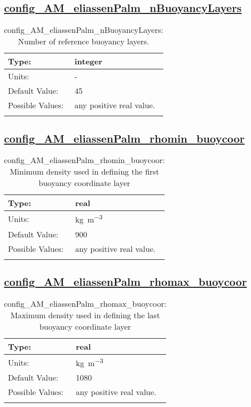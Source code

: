\subsection[config\_AM\_eliassenPalm\_nBuoyancyLayers]{\hyperref[sec:nm_tab_AM_eliassenPalm]{config\_AM\_eliassenPalm\_nBuoyancyLayers}}
\label{subsec:nm_sec_config_AM_eliassenPalm_nBuoyancyLayers}
\begin{center}
\begin{longtable}{| p{2.0in} || p{4.0in} |}
    \hline
    Type: & integer \\
    \hline
    Units: & \si{-} \\
    \hline
    Default Value: & 45 \\
    \hline
    Possible Values: & any positive real value. \\
    \hline
    \caption{config\_AM\_eliassenPalm\_nBuoyancyLayers: Number of reference buoyancy layers.}
\end{longtable}
\end{center}
\subsection[config\_AM\_eliassenPalm\_rhomin\_buoycoor]{\hyperref[sec:nm_tab_AM_eliassenPalm]{config\_AM\_eliassenPalm\_rhomin\_buoycoor}}
\label{subsec:nm_sec_config_AM_eliassenPalm_rhomin_buoycoor}
\begin{center}
\begin{longtable}{| p{2.0in} || p{4.0in} |}
    \hline
    Type: & real \\
    \hline
    Units: & \si{kg.m^{-3}} \\
    \hline
    Default Value: & 900 \\
    \hline
    Possible Values: & any positive real value. \\
    \hline
    \caption{config\_AM\_eliassenPalm\_rhomin\_buoycoor: Minimum density used in defining the first buoyancy coordinate layer}
\end{longtable}
\end{center}
\subsection[config\_AM\_eliassenPalm\_rhomax\_buoycoor]{\hyperref[sec:nm_tab_AM_eliassenPalm]{config\_AM\_eliassenPalm\_rhomax\_buoycoor}}
\label{subsec:nm_sec_config_AM_eliassenPalm_rhomax_buoycoor}
\begin{center}
\begin{longtable}{| p{2.0in} || p{4.0in} |}
    \hline
    Type: & real \\
    \hline
    Units: & \si{kg.m^{-3}} \\
    \hline
    Default Value: & 1080 \\
    \hline
    Possible Values: & any positive real value. \\
    \hline
    \caption{config\_AM\_eliassenPalm\_rhomax\_buoycoor: Maximum density used in defining the last buoyancy coordinate layer}
\end{longtable}
\end{center}
